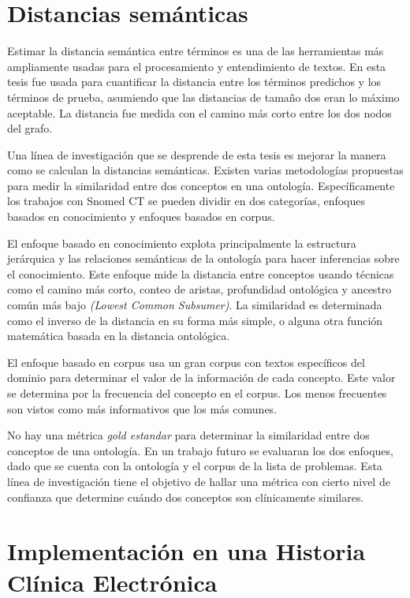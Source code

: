 \section{Distancias semánticas}

Estimar la distancia semántica entre términos es una de las herramientas más ampliamente usadas para el procesamiento y entendimiento de textos. En esta tesis fue usada para cuantificar la distancia entre los términos predichos y los términos de prueba, asumiendo que las distancias de tamaño dos eran lo máximo aceptable. La distancia fue medida con el camino más corto entre los dos nodos del grafo.

Una línea de investigación que se desprende de esta tesis es mejorar la manera como se calculan la distancias semánticas. Existen varias metodologías propuestas para medir la similaridad entre dos conceptos en una ontología. Específicamente los trabajos con Snomed CT se pueden dividir en dos categorías, enfoques basados en conocimiento y enfoques basados en corpus.  \cite{Mabotuwana2013,BenAouicha2016,Sanchez2011,Harispe2014}

El enfoque basado en conocimiento explota principalmente la estructura jerárquica y las relaciones semánticas de la ontología para hacer inferencias sobre el conocimiento. Este enfoque mide la distancia entre conceptos usando técnicas como el camino más corto, conteo de aristas, profundidad ontológica y ancestro común más bajo \textit{(Lowest Common Subsumer)}. La similaridad es determinada como el inverso de la distancia en su forma más simple, o alguna otra función matemática basada en la distancia ontológica.\cite{Mabotuwana2013}

El enfoque basado en corpus usa un gran corpus con textos específicos del dominio para determinar el valor de la información de cada concepto. Este valor se determina por la frecuencia del concepto en el corpus. Los menos frecuentes son vistos como más informativos que los más comunes.\cite{Mabotuwana2013}

No hay una métrica \textit{gold estandar} para determinar la similaridad entre dos conceptos de una ontología. En un trabajo futuro se evaluaran los dos enfoques, dado que se cuenta con la ontología y el corpus de la lista de problemas. Esta línea de investigación tiene  el objetivo de hallar una métrica con cierto nivel de confianza que determine cuándo dos conceptos son clínicamente similares.

\section{Implementación en una Historia Clínica Electrónica}


